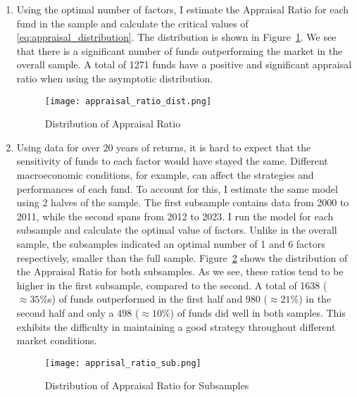 \begin{solution}
\begin{enumerate}[label = \Alph*)]
    \item Using the optimal number of factors, I estimate the Appraisal Ratio for each fund in the sample and calculate the critical values of \eqref{eq:appraisal_distribution}. The distribution is shown in Figure~\ref{fig:appraisal_dist}. We see that there is a significant number of funds outperforming the market in the overall sample. A total of 1271 funds have a positive and significant appraisal ratio when using the asymptotic distribution.
    
    \begin{figure}[!htbp]
        \begin{small}
            \begin{center}
                \texttt{[image: appraisal\_ratio\_dist.png]}
            \end{center}
            \caption{Distribution of Appraisal Ratio}
            \label{fig:appraisal_dist}
        \end{small}
    \end{figure}
    
    \item Using data for over 20 years of returns, it is hard to expect that the sensitivity of funds to each factor would have stayed the same. Different macroeconomic conditions, for example, can affect the strategies and performances of each fund. To account for this, I estimate the same model using 2 halves of the sample. The first subsample contains data from 2000 to 2011, while the second spans from 2012 to 2023. I run the model for each subsample and calculate the optimal value of factors. Unlike in the overall sample, the subsamples indicated an optimal number of 1 and 6 factors respectively, smaller than the full sample. Figure~\ref{fig:ck_appraisal_sub} shows the distribution of the Appraisal Ratio for both subsamples. As we see, these ratios tend to be higher in the first subsample, compared to the second. A total of 1638 (\(\approx 35\%\)s) of funds outperformed in the first half and 980 (\(\approx 21\%\)) in the second half and only a 498 (\(\approx 10\%\)) of funds did well in both samples. This exhibits the difficulty in maintaining a good strategy throughout different market conditions.
    
    \begin{figure}[!htbp]
        \begin{small}
            \begin{center}
                \texttt{[image: apprisal\_ratio\_sub.png]}
            \end{center}
            \caption{Distribution of Appraisal Ratio for Subsamples}
            \label{fig:ck_appraisal_sub}
        \end{small}
    \end{figure}
    
\end{enumerate}
\end{solution}